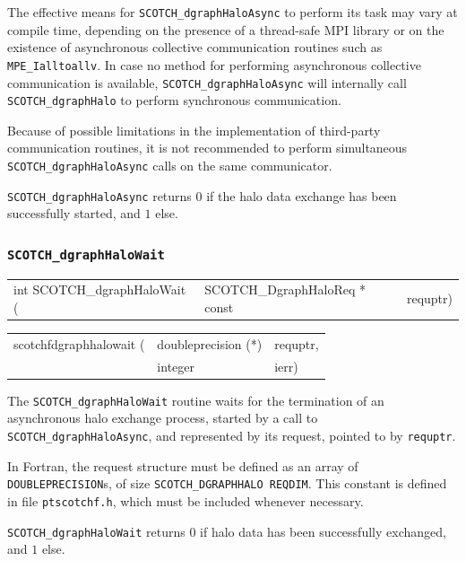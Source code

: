 \begin{itemize}
The effective means for {\tt SCOTCH\_dgraph\lbt Halo\lbt Async} to
perform its task may vary at compile time, depending on the presence
of a thread-safe MPI library or on the existence of asynchronous
collective communication routines such as {\tt MPE\_\lbt Ialltoallv}.
In case no method for performing asynchronous collective communication
is available, {\tt SCOTCH\_dgraph\lbt Halo\lbt Async} will internally
call {\tt SCOTCH\_dgraph\lbt Halo} to perform synchronous communication.

Because of possible limitations in the implementation of third-party
communication routines, it is not recommended to perform simultaneous
{\tt SCOTCH\_dgraph\lbt Halo\lbt Async} calls on the same communicator.

\progret

{\tt SCOTCH\_dgraphHaloAsync} returns $0$ if the halo data exchange
has been successfully started, and $1$ else.
\end{itemize}

\subsubsection{{\tt SCOTCH\_dgraphHaloWait}}
\label{sec-lib-dgraphhalowait}

\begin{itemize}
\progsyn

{\tt\begin{tabular}{l@{}ll}

int SCOTCH\_dgraphHaloWait ( & SCOTCH\_DgraphHaloReq * const & requptr)
\end{tabular}}

{\tt\begin{tabular}{l@{}ll}
scotchfdgraphhalowait ( & doubleprecision (*) & requptr, \\
                        & integer             & ierr)
\end{tabular}}

\progdes

The {\tt SCOTCH\_dgraphHaloWait} routine waits for the termination of
an asynchronous halo exchange process, started by a call to {\tt
SCOTCH\_dgraph\lbt Halo\lbt Async}, and represented by its request,
pointed to by {\tt requptr}.

In Fortran, the request structure must be defined as an array of
{\tt DOUBLEPRECISION}s, of size {\tt SCOTCH\_\lbt DGRAPH\lbt HALO\lbt
REQDIM}. This constant is defined in file {\tt ptscotchf.h}, which
must be included whenever necessary.

\progret

{\tt SCOTCH\_dgraphHaloWait} returns $0$ if halo data has been
successfully exchanged, and $1$ else.
\end{itemize}

